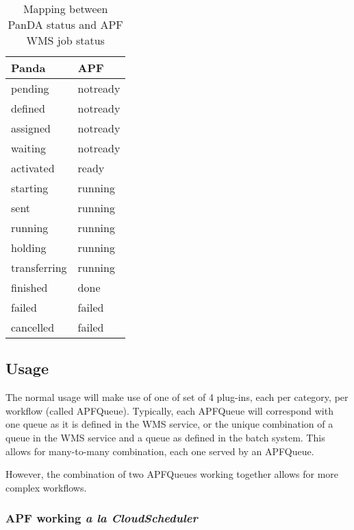 \documentclass[a4paper]{jpconf}
\begin{document}
\begin{table}
   \begin{center}
      \begin{tabular}{l l}
         \hline
         \textbf{Panda}         & \textbf{APF}       \\
         \hline
         pending       & notready  \\ 
         defined       & notready  \\ 
         assigned      & notready  \\ 
         waiting       & notready  \\ 
         activated     & ready     \\ 
         starting      & running   \\ 
         sent          & running   \\ 
         running       & running   \\ 
         holding       & running   \\ 
         transferring  & running   \\ 
         finished      & done      \\ 
         failed        & failed    \\ 
         cancelled     & failed    \\ 
         \hline
      \end{tabular}
   \end{center}
   \caption{Mapping between PanDA status and APF WMS job status}
   \label{translation}
\end{table}


\subsection{Usage}

The normal usage will make use of one of set of 4 plug-ins, each per category, per workflow (called APFQueue). 
Typically, each APFQueue will correspond with one queue as it is defined in the WMS service, 
or the unique combination of a queue in the WMS service and a queue as defined in the batch system. 
This allows for many-to-many combination, each one served by an APFQueue. 

However, the combination of two APFQueues working together allows for more complex workflows.

\subsubsection{APF working \emph{a la CloudScheduler}}
\end{document}
